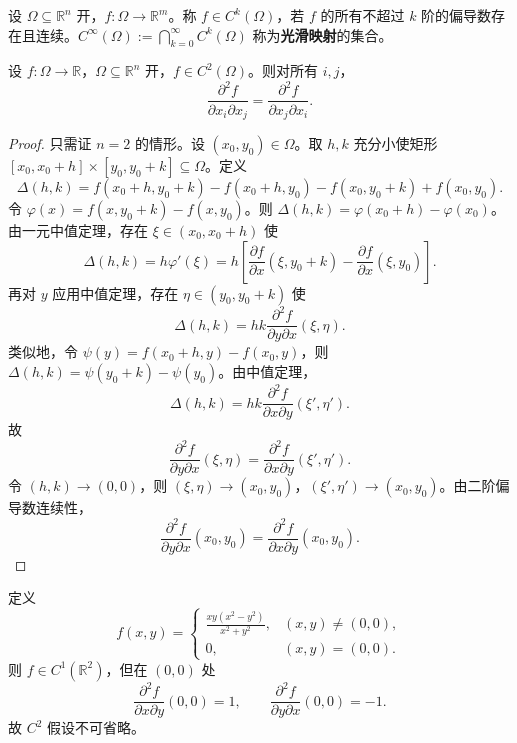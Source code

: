 \begin{definition}[$C^k$ 映射]\label{def:ck_mapping}
设 $\Omega \subseteq \mathbb{R}^n$ 开，$f: \Omega \to \mathbb{R}^m$。称 $f \in C^k(\Omega)$，若 $f$ 的所有不超过 $k$ 阶的偏导数存在且连续。$C^\infty(\Omega) := \bigcap_{k=0}^{\infty} C^k(\Omega)$ 称为\textbf{光滑映射}的集合。
\end{definition}

\begin{theorem}\label{thm:clairaut_ra}
设 $f: \Omega \to \mathbb{R}$，$\Omega \subseteq \mathbb{R}^n$ 开，$f \in C^2(\Omega)$。则对所有 $i, j$，
\[
\frac{\partial^2 f}{\partial x_i \partial x_j} = \frac{\partial^2 f}{\partial x_j \partial x_i}.
\]
\end{theorem}

\begin{proof}
只需证 $n = 2$ 的情形。设 $(x_0, y_0) \in \Omega$。取 $h, k$ 充分小使矩形 $[x_0, x_0 + h] \times [y_0, y_0 + k] \subseteq \Omega$。定义
\[
\Delta(h, k) = f(x_0 + h, y_0 + k) - f(x_0 + h, y_0) - f(x_0, y_0 + k) + f(x_0, y_0).
\]
令 $\varphi(x) = f(x, y_0 + k) - f(x, y_0)$。则 $\Delta(h, k) = \varphi(x_0 + h) - \varphi(x_0)$。由一元中值定理，存在 $\xi \in (x_0, x_0 + h)$ 使
\[
\Delta(h, k) = h \varphi'(\xi) = h \left[ \frac{\partial f}{\partial x}(\xi, y_0 + k) - \frac{\partial f}{\partial x}(\xi, y_0) \right].
\]
再对 $y$ 应用中值定理，存在 $\eta \in (y_0, y_0 + k)$ 使
\[
\Delta(h, k) = hk \frac{\partial^2 f}{\partial y \partial x}(\xi, \eta).
\]
类似地，令 $\psi(y) = f(x_0 + h, y) - f(x_0, y)$，则 $\Delta(h, k) = \psi(y_0 + k) - \psi(y_0)$。由中值定理，
\[
\Delta(h, k) = hk \frac{\partial^2 f}{\partial x \partial y}(\xi', \eta').
\]
故
\[
\frac{\partial^2 f}{\partial y \partial x}(\xi, \eta) = \frac{\partial^2 f}{\partial x \partial y}(\xi', \eta').
\]
令 $(h, k) \to (0, 0)$，则 $(\xi, \eta) \to (x_0, y_0)$，$(\xi', \eta') \to (x_0, y_0)$。由二阶偏导数连续性，
\[
\frac{\partial^2 f}{\partial y \partial x}(x_0, y_0) = \frac{\partial^2 f}{\partial x \partial y}(x_0, y_0).
\]
\end{proof}

\begin{example}[混合偏导数不连续时交换失效]\label{ex:clairaut_failure_ra}
定义
\[
f(x, y) = \begin{cases} \frac{xy(x^2 - y^2)}{x^2 + y^2}, & (x, y) \neq (0, 0), \\ 0, & (x, y) = (0, 0). \end{cases}
\]
则 $f \in C^1(\mathbb{R}^2)$，但在 $(0, 0)$ 处
\[
\frac{\partial^2 f}{\partial x \partial y}(0, 0) = 1, \qquad \frac{\partial^2 f}{\partial y \partial x}(0, 0) = -1.
\]
故 $C^2$ 假设不可省略。
\end{example}


